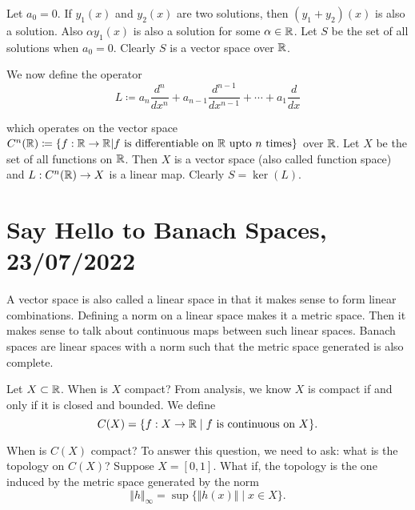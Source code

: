 \documentclass{amsart}
\begin{document}
Let $a_0=0$. If $y_1(x)$ and $y_2(x)$ are two solutions, then $(y_1+y_2)(x)$ is also a solution. Also $\alpha y_1(x)$ is also a solution for some $\alpha \in \mathbb{R}$. Let $S$ be the set of all solutions when $a_0 = 0$. Clearly $S$ is a vector space over $\mathbb{R}$.

We now define the operator 
\begin{displaymath}
L \coloneqq a_n \frac{d^n}{dx^n} + a_{n-1} \frac{d^{n-1}}{dx^{n-1}} + \cdots + a_1 \frac{d}{dx}
\end{displaymath}

which operates on the vector space $C^n(\mathbb{R})\coloneqq \{f:\mathbb{R} \to \mathbb{R} | f \text{ is differentiable on } \mathbb{R} \text{ upto } n \text{ times}\}$ over $\mathbb{R}$. Let $X$ be the set of all functions on $\mathbb{R}$. Then $X$ is a vector space (also called function space) and $L:C^n(\mathbb{R}) \to X$ is a linear map. Clearly $S = \ker(L)$.


\section{Say Hello to Banach Spaces, 23/07/2022}

A vector space is also called a linear space in that it makes sense to form linear combinations. Defining a norm on a linear space makes it a metric space. Then it makes sense to talk about continuous maps between such linear spaces. Banach spaces are linear spaces with a norm such that the metric space generated is also complete.

Let $X\subset \mathbb{R}$. When is $X$ compact? From analysis, we know $X$ is compact if and only if it is closed and bounded. We define 
\begin{displaymath}
C(X) = \{ f: X \to \mathbb{R} \mid f \text{ is continuous on } X\}.
\end{displaymath}

When is $C(X)$ compact? To answer this question, we need to ask: what is the topology on $C(X)$? Suppose $X= [0,1]$. What if, the topology is the one induced by the metric space generated by the norm 
\begin{displaymath}
\Vert h \Vert_{\infty} = \sup\{\Vert h(x) \Vert \mid x \in X\}.
\end{displaymath}

\end{document}

